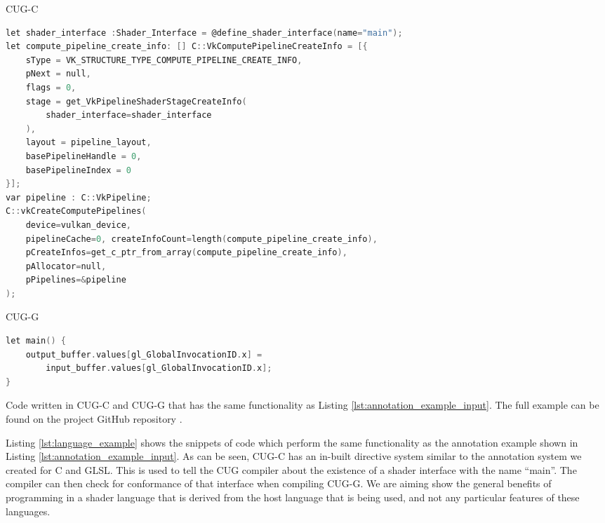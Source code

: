 \documentclass[a4paper,12pt,twoside,openright]{report}
\begin{document}


\begin{lstfloat}
\begin{center} CUG-C \end{center}
\begin{lstlisting}[language=C]
let shader_interface :Shader_Interface = @define_shader_interface(name="main");
let compute_pipeline_create_info: [] C::VkComputePipelineCreateInfo = [{
    sType = VK_STRUCTURE_TYPE_COMPUTE_PIPELINE_CREATE_INFO,
    pNext = null,
    flags = 0,
    stage = get_VkPipelineShaderStageCreateInfo(
        shader_interface=shader_interface
    ),
    layout = pipeline_layout,
    basePipelineHandle = 0,
    basePipelineIndex = 0
}];
var pipeline : C::VkPipeline;
C::vkCreateComputePipelines(
    device=vulkan_device,
    pipelineCache=0, createInfoCount=length(compute_pipeline_create_info),
    pCreateInfos=get_c_ptr_from_array(compute_pipeline_create_info),
    pAllocator=null,
    pPipelines=&pipeline
);
\end{lstlisting}
\begin{center} CUG-G \end{center}
\begin{lstlisting}[language=C]
let main() {
    output_buffer.values[gl_GlobalInvocationID.x] =
        input_buffer.values[gl_GlobalInvocationID.x];
}
\end{lstlisting}
\caption{Code written in CUG-C and CUG-G that has the same functionality as
Listing \ref{lst:annotation_example_input}. The full example can be found on
the project GitHub repository \cite{ProjectSource}.}
\label{lst:language_example}
\end{lstfloat}

Listing \ref{lst:language_example} shows the snippets of code which perform the
same functionality as the annotation example shown in Listing
\ref{lst:annotation_example_input}. As can be seen, CUG-C has an in-built
directive system similar to the annotation system we created for C and GLSL.
This is used to tell the CUG compiler about the existence of a shader interface
with the name ``main''. The compiler can then check for conformance of that
interface when compiling CUG-G. We are aiming show the general benefits of
programming in a shader language that is derived from the host language that is
being used, and not any particular features of these languages.
\end{document}

